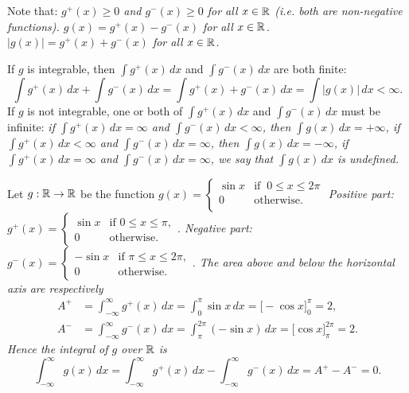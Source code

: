 Note that:
\bit
\it $g^{+}(x)\geq 0$ and $g^{-}(x)\geq 0$ for all $x\in\mathbb{R}$ (i.e. both are non-negative functions).
\it $g(x)	= g^{+}(x) - g^{-}(x)$ for all $x\in\mathbb{R}$.
\it $|g(x)|	= g^{+}(x) + g^{-}(x)$ for all $x\in\mathbb{R}$.
\eit

If $g$ is integrable, then $\displaystyle\int g^{+}(x)\,dx$ and $\displaystyle\int g^{-}(x)\,dx$ are both finite:
\[
\int g^{+}(x)\,dx + \int g^{-}(x)\,dx =\int g^{+}(x) + g^{-}(x)\,dx = \int |g(x)|\,dx < \infty.
\]
If $g$ is not integrable, one or both of $\displaystyle\int g^{+}(x)\,dx$ and $\displaystyle\int g^{-}(x)\,dx$ must be infinite:
\bit
\it if $\displaystyle\int g^{+}(x)\,dx =\infty$ and $\displaystyle\int g^{-}(x)\,dx <\infty$, then $\displaystyle\int g(x)\,dx = +\infty$,
\it if $\displaystyle\int g^{+}(x)\,dx <\infty$ and $\displaystyle\int g^{-}(x)\,dx =\infty$, then $\displaystyle\int g(x)\,dx = -\infty$,
\it if $\displaystyle\int g^{+}(x)\,dx =\infty$ and $\displaystyle\int g^{-}(x)\,dx =\infty$, we say that $\displaystyle\int g(x)\,dx$ is \emph{undefined}.
\eit

\begin{example}\label{ex:integration}
Let $g:\mathbb{R}\to\mathbb{R}$ be the function
$
g(x) = \begin{cases}
	\sin x & \text{if }\ 0\leq x\leq 2\pi \\
	0 	& \text{otherwise.} \\
\end{cases}
$
\bit
\it Positive part: $g^{+}(x) = \begin{cases} \sin x 	& \text{if } 0\leq x \leq \pi,		\\ 0 & \text{otherwise.}\end{cases}$. 
\it Negative part: $g^{-}(x) = \begin{cases} -\sin x 	& \text{if } \pi\leq x \leq 2\pi,	\\ 0 & \text{otherwise.}\end{cases}$.
\eit
The area above and below the horizontal axis are respectively
\begin{align*}
A^{+}	& = \int_{-\infty}^{\infty} g^{+}(x)\,dx = \int_{0}^{\pi} \sin x\,dx = \big[-\cos x\big]_0^\pi = 2, \\
A^{-}	& = \int_{-\infty}^{\infty} g^{-}(x)\,dx = \int_{\pi}^{2\pi} (-\sin x)\,dx = \big[\cos x\big]_{\pi}^{2\pi} = 2. 
\end{align*}
Hence the integral of $g$ over $\mathbb{R}$ is
\[
\int_{-\infty}^{\infty} g(x)\,dx = \int_{-\infty}^{\infty} g^{+}(x)\,dx - \int_{-\infty}^{\infty} g^{-}(x)\,dx =  A^{+} - A^{-} = 0.
\]
\end{example}

